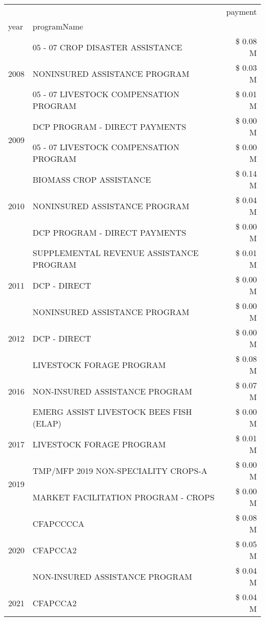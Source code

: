 \begin{tabular}{llr}
\toprule
 &  & payment \\
year & programName &  \\
\midrule
\multirow[t]{3}{*}{2008} & 05 - 07 CROP DISASTER ASSISTANCE & \$ 0.08 M \\
 & NONINSURED ASSISTANCE PROGRAM & \$ 0.03 M \\
 & 05 - 07 LIVESTOCK COMPENSATION PROGRAM & \$ 0.01 M \\
\cline{1-3}
\multirow[t]{2}{*}{2009} & DCP PROGRAM - DIRECT PAYMENTS & \$ 0.00 M \\
 & 05 - 07 LIVESTOCK COMPENSATION PROGRAM & \$ 0.00 M \\
\cline{1-3}
\multirow[t]{3}{*}{2010} & BIOMASS CROP ASSISTANCE & \$ 0.14 M \\
 & NONINSURED ASSISTANCE PROGRAM & \$ 0.04 M \\
 & DCP PROGRAM - DIRECT PAYMENTS & \$ 0.00 M \\
\cline{1-3}
\multirow[t]{3}{*}{2011} & SUPPLEMENTAL REVENUE ASSISTANCE PROGRAM & \$ 0.01 M \\
 & DCP - DIRECT & \$ 0.00 M \\
 & NONINSURED ASSISTANCE PROGRAM & \$ 0.00 M \\
\cline{1-3}
2012 & DCP - DIRECT & \$ 0.00 M \\
\cline{1-3}
\multirow[t]{3}{*}{2016} & LIVESTOCK FORAGE PROGRAM & \$ 0.08 M \\
 & NON-INSURED ASSISTANCE PROGRAM & \$ 0.07 M \\
 & EMERG ASSIST LIVESTOCK BEES FISH (ELAP) & \$ 0.00 M \\
\cline{1-3}
2017 & LIVESTOCK FORAGE PROGRAM & \$ 0.01 M \\
\cline{1-3}
\multirow[t]{2}{*}{2019} & TMP/MFP 2019 NON-SPECIALITY CROPS-A & \$ 0.00 M \\
 & MARKET FACILITATION PROGRAM - CROPS & \$ 0.00 M \\
\cline{1-3}
\multirow[t]{3}{*}{2020} & CFAPCCCCA & \$ 0.08 M \\
 & CFAPCCA2 & \$ 0.05 M \\
 & NON-INSURED ASSISTANCE PROGRAM & \$ 0.04 M \\
\cline{1-3}
2021 & CFAPCCA2 & \$ 0.04 M \\
\cline{1-3}
\bottomrule
\end{tabular}
